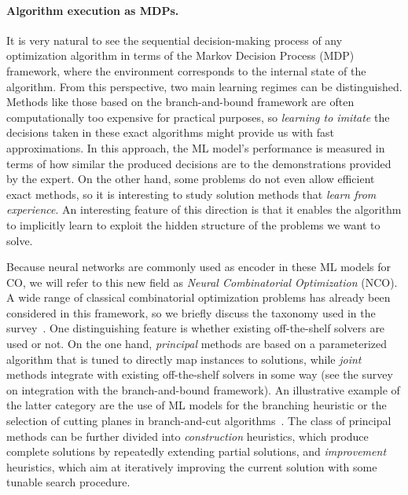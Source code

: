 \documentclass[a4paper]{report}
\theoremstyle{definition}
\theoremstyle{plain}
\begin{document}
\paragraph{Algorithm execution as MDPs.}
It is very natural to see the sequential decision-making process of any
optimization algorithm in terms of the Markov Decision Process (MDP) framework,
where the environment corresponds to the internal state of the algorithm. From
this perspective, two main learning regimes can be distinguished.
Methods like those based on the branch-and-bound framework are
often computationally too expensive for practical purposes, so \textit{learning
  to imitate} the decisions taken in these exact algorithms might provide us
with fast approximations. In this approach, the ML model's performance is
measured in terms of how similar the produced decisions are to the
demonstrations provided by the expert.
On the other hand, some problems do not even allow efficient exact methods, so it is
interesting to study solution methods that \textit{learn from experience}. An
interesting feature of this direction is that it enables the algorithm to implicitly
learn to exploit the hidden structure of the problems we want to solve.

Because neural networks are commonly used as encoder in these ML models for CO,
we will refer to this new field as \textit{Neural Combinatorial Optimization} (NCO).
%
A wide range of classical combinatorial optimization problems has already been
considered in this framework, so we briefly discuss the taxonomy used in the
survey~\cite{mazyavkinaReinforcementLearningCombinatorial2020}.
One distinguishing feature is whether existing off-the-shelf solvers are used or
not. On the one hand, \textit{principal} methods are based on a parameterized algorithm
that is tuned to directly map instances to solutions, while \textit{joint} methods
integrate with existing off-the-shelf solvers in some way (see the
survey~\cite{lodiLearningBranchingSurvey2017} on integration with the
branch-and-bound framework). An illustrative example of the latter category are
the use of ML models for the branching heuristic or the selection of cutting
planes in branch-and-cut algorithms~\cite{tangReinforcementLearningInteger2020}.
The class of principal methods can be further divided into \textit{construction}
heuristics, which produce complete solutions by repeatedly extending partial
solutions, and \textit{improvement} heuristics, which aim at iteratively improving the
current solution with some tunable search procedure.
\end{document}
